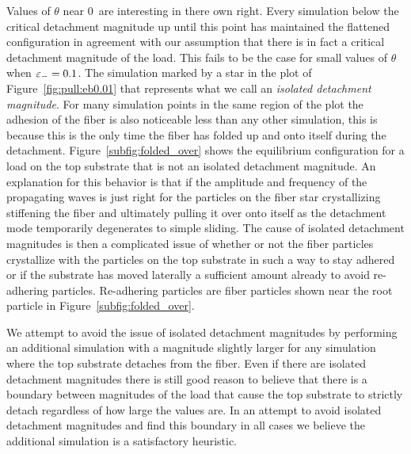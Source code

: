 Values of $\theta$ near $0$\textdegree\ are interesting in there own right. Every simulation below the critical detachment magnitude up until this point has maintained the flattened configuration in agreement with our assumption that there is in fact a critical detachment magnitude of the load. This fails to be the case for small values of $\theta$ when $\varepsilon_-=0.1$. The simulation marked by a star in the plot of Figure~\ref{fig:pull:eb0.01} that represents what we call an \textit{isolated detachment magnitude}. For many simulation points in the same region of the plot the adhesion of the fiber is also noticeable less than any other simulation, this is because this is the only time the fiber has folded up and onto itself during the detachment. Figure~\ref{subfig:folded_over} shows the equilibrium configuration for a load on the top substrate that is not an isolated detachment magnitude. An explanation for this behavior is that if the amplitude and frequency of the propagating waves is just right for the particles on the fiber star crystallizing stiffening the fiber and ultimately pulling it over onto itself as the detachment mode temporarily degenerates to simple sliding. The cause of isolated detachment magnitudes is then a complicated issue of whether or not the fiber particles crystallize with the particles on the top substrate in such a way to stay adhered or if the substrate has moved laterally a sufficient amount already to avoid re-adhering particles. Re-adhering particles are fiber particles shown near the root particle in Figure~\ref{subfig:folded_over}.

We attempt to avoid the issue of isolated detachment magnitudes by performing an additional simulation with a magnitude slightly larger for any simulation where the top substrate detaches from the fiber. Even if there are isolated detachment magnitudes there is still good reason to believe that there is a boundary between magnitudes of the load that cause the top substrate to strictly detach regardless of how large the values are. In an attempt to avoid isolated detachment magnitudes and find this boundary in all cases we believe the additional simulation is a satisfactory heuristic.

